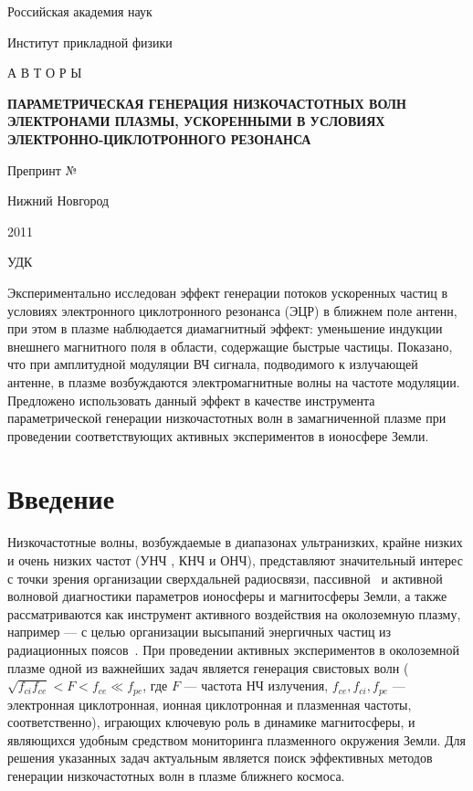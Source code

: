 \documentclass[autoref,10pt]{disser}
\begin{document}
\Russian
\thispagestyle{empty}
\vspace{1.5cm}
\centerline{Российская академия наук}
\centerline{Институт прикладной физики}
\vspace{3cm}
\centerline{А В Т О Р Ы}
\vspace{0.8cm}
\begin{center}
\large 
\textbf{ПАРАМЕТРИЧЕСКАЯ ГЕНЕРАЦИЯ НИЗКОЧАСТОТНЫХ ВОЛН ЭЛЕКТРОНАМИ ПЛАЗМЫ, УСКОРЕННЫМИ В УСЛОВИЯХ ЭЛЕКТРОННО-ЦИКЛОТРОННОГО РЕЗОНАНСА}
\end{center}
\vspace{2cm}
\centerline{\large Препринт № }
\vfill
\centerline{Нижний Новгород}
\centerline{2011}
\newpage
\thispagestyle{empty}
\begin{flushleft}
УДК
\end{flushleft}

Экспериментально исследован эффект генерации потоков ускоренных частиц в условиях электронного циклотронного резонанса (ЭЦР) в ближнем поле антенн, при этом в плазме наблюдается диамагнитный эффект: уменьшение индукции внешнего магнитного поля в области, содержащие быстрые частицы. Показано, что при амплитудной модуляции ВЧ сигнала, подводимого к излучающей антенне, в плазме возбуждаются электромагнитные волны на частоте модуляции. Предложено использовать данный эффект в качестве  инструмента параметрической генерации  низкочастотных волн в замагниченной плазме при проведении соответствующих активных экспериментов в ионосфере Земли. 

\newpage
\section{Введение}
Низкочастотные волны, возбуждаемые в диапазонах ультранизких, крайне низких и очень низких частот (УНЧ , КНЧ и ОНЧ), представляют значительный интерес с точки зрения организации сверхдальней радиосвязи, пассивной~\cite{AWD} и активной~\cite{IMAGE,RPI} волновой диагностики параметров ионосферы и магнитосферы Земли, а также рассматриваются как инструмент активного воздействия на околоземную плазму, например --- с целью организации высыпаний энергичных частиц из радиационных поясов~\cite{Demekhov, InanBellBortnik, Rory}. При проведении активных экспериментов в околоземной плазме одной из важнейших задач является генерация свистовых волн ($\sqrt{f_{ci}f_{ce}}<F<f_{ce}\ll f_{pe}$, где $F$ --- частота НЧ излучения, $f_{ce}, f_{ci}, f_{pe}$ --- электронная циклотронная, ионная циклотронная и плазменная частоты, соответственно), играющих ключевую роль в динамике магнитосферы, и являющихся удобным средством мониторинга плазменного  окружения Земли. Для решения указанных задач актуальным является поиск эффективных методов генерации низкочастотных волн в плазме ближнего космоса. 
\end{document}
